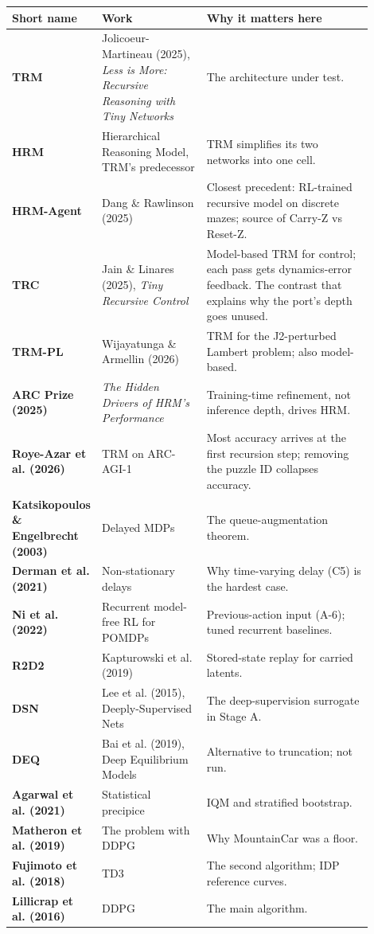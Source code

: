 \documentclass[11pt]{article}
\begin{document}
\begin{center}\small\begin{tabular}{>{\raggedright\arraybackslash}p{0.149\linewidth}>{\raggedright\arraybackslash}p{0.293\linewidth}>{\raggedright\arraybackslash}p{0.463\linewidth}}
\toprule
Short name & Work & Why it matters here \\
\midrule
\textbf{TRM} & Jolicoeur-Martineau (2025), \emph{Less is More: Recursive Reasoning with Tiny Networks} & The architecture under test. \\
\textbf{HRM} & Hierarchical Reasoning Model, TRM's predecessor & TRM simplifies its two networks into one cell. \\
\textbf{HRM-Agent} & Dang \& Rawlinson (2025) & Closest precedent: RL-trained recursive model on discrete mazes; source of Carry-Z vs Reset-Z. \\
\textbf{TRC} & Jain \& Linares (2025), \emph{Tiny Recursive Control} & Model-based TRM for control; each pass gets dynamics-error feedback. The contrast that explains why the port's depth goes unused. \\
\textbf{TRM-PL} & Wijayatunga \& Armellin (2026) & TRM for the J2-perturbed Lambert problem; also model-based. \\
\textbf{ARC Prize (2025)} & \emph{The Hidden Drivers of HRM's Performance} & Training-time refinement, not inference depth, drives HRM. \\
\textbf{Roye-Azar et al. (2026)} & TRM on ARC-AGI-1 & Most accuracy arrives at the first recursion step; removing the puzzle ID collapses accuracy. \\
\textbf{Katsikopoulos \& Engelbrecht (2003)} & Delayed MDPs & The queue-augmentation theorem. \\
\textbf{Derman et al. (2021)} & Non-stationary delays & Why time-varying delay (C5) is the hardest case. \\
\textbf{Ni et al. (2022)} & Recurrent model-free RL for POMDPs & Previous-action input (A-6); tuned recurrent baselines. \\
\textbf{R2D2} & Kapturowski et al. (2019) & Stored-state replay for carried latents. \\
\textbf{DSN} & Lee et al. (2015), Deeply-Supervised Nets & The deep-supervision surrogate in Stage A. \\
\textbf{DEQ} & Bai et al. (2019), Deep Equilibrium Models & Alternative to truncation; not run. \\
\textbf{Agarwal et al. (2021)} & Statistical precipice & IQM and stratified bootstrap. \\
\textbf{Matheron et al. (2019)} & The problem with DDPG & Why MountainCar was a floor. \\
\textbf{Fujimoto et al. (2018)} & TD3 & The second algorithm; IDP reference curves. \\
\textbf{Lillicrap et al. (2016)} & DDPG & The main algorithm. \\
\bottomrule
\end{tabular}\end{center}
\end{document}
